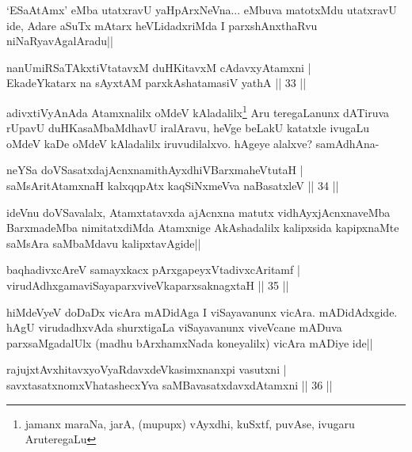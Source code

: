 \begin{artha}
`ESaAtAmx' eMba utatxravU yaHpArxNeVna... eMbuva matotxMdu utatxravU ide, Adare aSuTx mAtarx heVLidadxriMda I parxshAnxthaRvu niNaRyavAgalAradu||
\end{artha}


\begin{shl}
nanUmiRSaTAkxtiVtatavxM duHKitavxM cAdavxyAtamxni |\\
EkadeYkatarx na sAyxtAM parxkAshatamasiV yathA \hfill || 33 ||
\end{shl}

\begin{artha}
adivxtiVyAnAda Atamxnalilx oMdeV kAladalilx\footnote[1]{jamanx maraNa, jarA, (mupupx) vAyxdhi, kuSxtf, puvAse, ivugaru AruteregaLu}  Aru teregaLanunx dATiruva rUpavU duHKasaMbaMdhavU iralAravu, heVge beLakU katatxle ivugaLu oMdeV kaDe oMdeV kAladalilx iruvudilalxvo. hAgeye alalxve? samAdhAna-
\end{artha}

\begin{shl}
neYSa doVSasatxdajAcnxnamithAyxdhiVBarxmaheVtutaH |\\
saMsAritA\s \s tamxnaH kalxqqpAtx kaqSiNxmeVva naBasatxleV \hfill || 34 ||
\end{shl}

\begin{artha}%
ideVnu doVSavalalx, Atamxtatavxda ajAcnxna matutx vidhAyxjAcnxnaveMba BarxmadeMba nimitatxdiMda Atamxnige AkAshadalilx kalipxsida kapipxnaMte saMsAra saMbaMdavu kalipxtavAgide||
\end{artha}

\begin{shl}
baqhadivxcAreV samayxkacx pArxgapeyxVtadivxcAritamf |\\
virudAdhxgamaviSayaparxviveVkaparxsaknagxtaH \hfill || 35 ||
\end{shl}

\begin{artha}
hiMdeVyeV doDaDx vicAra mADidAga I viSayavanunx vicAra. mADidAdxgide. hAgU virudadhxvAda shurxtigaLa viSayavanunx viveVcane mADuva parxsaMgadalUlx (madhu bArxhamxNada koneyalilx) vicAra mADiye ide||
\end{artha}

\begin{shl}
rajujxtAvxhitavxyoVyaRdavxdeVkasimxnanxpi vasutxni |\\
savxtasatxnomxVhatashecxYva saMBavasatxdavxdAtamxni \hfill || 36 ||
\end{shl}

